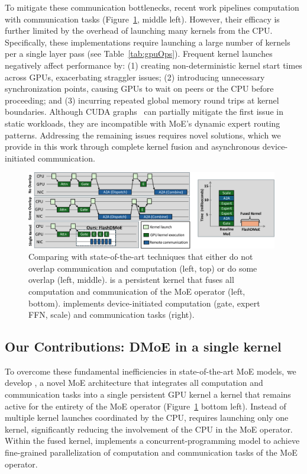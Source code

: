 To mitigate these communication bottlenecks,
recent work pipelines computation with communication tasks (Figure~\ref{fig:intro}, middle left).
However, their efficacy is further limited by the overhead of launching many kernels from the CPU\@.
Specifically, these implementations require launching a large number of kernels per a single layer pass
(see Table~\ref{tab:gpuOps}).
Frequent kernel launches negatively affect performance by:
(1) creating non-deterministic kernel start times across GPUs, exacerbating straggler issues;
(2) introducing unnecessary synchronization points, causing GPUs to wait on peers or the CPU before proceeding;
and (3) incurring repeated global memory round trips at kernel boundaries.
Although CUDA graphs~\cite{cuda_graphs_nvidia_blog} can partially mitigate the first issue in static workloads,
they are incompatible with MoE's dynamic expert routing patterns.
Addressing the remaining issues requires novel solutions,
which we provide in this work through complete kernel fusion and asynchronous device-initiated communication.


\begin{figure}[!ht]
    \centering
    \includegraphics[width=0.98\textwidth, keepaspectratio]{figures/intro-fig}
    \caption{Comparing \sysname with state-of-the-art techniques that either do not overlap communication and computation (left, top) or do some overlap (left, middle). \sysname is a persistent kernel that fuses all computation and communication of the MoE operator (left, bottom). \sysname implements device-initiated computation (gate, expert FFN, scale) and communication tasks (right).}
    \label{fig:intro}
    \vspace{-10pt}
\end{figure}

\subsection{Our Contributions: DMoE in a single kernel}
To overcome these fundamental inefficiencies in state-of-the-art MoE models, we develop \sysname,
a novel MoE architecture that integrates all computation and communication tasks into a single persistent GPU kernel
\ie a kernel that remains active for the entirety of the MoE operator (Figure~\ref{fig:intro} bottom left).
Instead of multiple kernel launches coordinated by the CPU, \sysname requires launching only one kernel,
significantly reducing the involvement of the CPU in the MoE operator.
Within the fused kernel, \sysname implements a concurrent-programming model to achieve fine-grained parallelization of
computation and communication tasks of the MoE operator.

